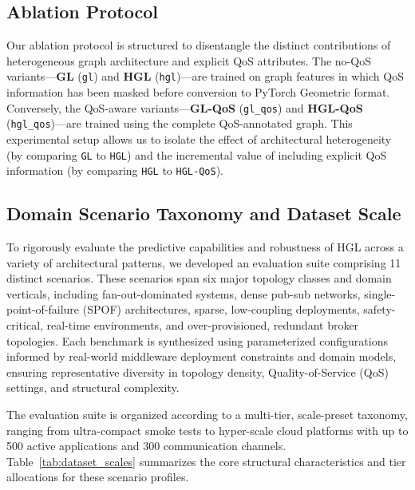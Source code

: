 \documentclass[sigconf,9pt,anonymous]{acmart}
\begin{document}
\subsection{Ablation Protocol}

Our ablation protocol is structured to disentangle the distinct contributions of heterogeneous graph architecture and explicit QoS attributes. The no-QoS variants—\textbf{GL} (\texttt{gl}) and \textbf{HGL} (\texttt{hgl})—are trained on graph features in which QoS information has been masked before conversion to PyTorch Geometric format. Conversely, the QoS-aware variants—\textbf{GL-QoS} (\texttt{gl\_qos}) and \textbf{HGL-QoS} (\texttt{hgl\_qos})—are trained using the complete QoS-annotated graph. This experimental setup allows us to isolate the effect of architectural heterogeneity (by comparing \texttt{GL} to \texttt{HGL}) and the incremental value of including explicit QoS information (by comparing \texttt{HGL} to \texttt{HGL-QoS}).

\subsection{Domain Scenario Taxonomy and Dataset Scale}

To rigorously evaluate the predictive capabilities and robustness of HGL across a variety of architectural patterns, we developed an evaluation suite comprising 11 distinct scenarios. These scenarios span six major topology classes and domain verticals, including fan-out-dominated systems, dense pub-sub networks, single-point-of-failure (SPOF) architectures, sparse, low-coupling deployments, safety-critical, real-time environments, and over-provisioned, redundant broker topologies. Each benchmark is synthesized using parameterized configurations informed by real-world middleware deployment constraints and domain models, ensuring representative diversity in topology density, Quality-of-Service (QoS) settings, and structural complexity.

The evaluation suite is organized according to a multi-tier, scale-preset taxonomy, ranging from ultra-compact smoke tests to hyper-scale cloud platforms with up to 500 active applications and 300 communication channels. Table~\ref{tab:dataset_scales} summarizes the core structural characteristics and tier allocations for these scenario profiles.
\end{document}
